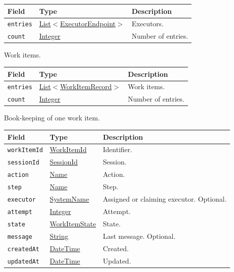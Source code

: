 \documentclass[a4paper]{arrowhead}
\newcommand{\mref}[1]{{\textcolor{ArrowheadPurple}{\hyperref[sec:model:#1]{#1}}}}
\newcommand{\pref}[1]{{\textcolor{ArrowheadGrey}{\hyperref[sec:model:primitives:#1]{#1}}}}
\begin{document}
{\small
\begin{longtable}{|p{3.9cm}|p{4.4cm}|p{7.5cm}|}

\hline
\rowcolor{gray!33} Field & Type & Description \\ \hline
\endhead
\texttt{entries} & \pref{List}$<$\mref{ExecutorEndpoint}$>$ & Executors. \\ \hline
\texttt{count} & \pref{Integer} & Number of entries. \\ \hline
\end{longtable}
}

Work items.

{\small
\begin{longtable}{|p{3.9cm}|p{4.4cm}|p{7.5cm}|}

\hline
\rowcolor{gray!33} Field & Type & Description \\ \hline
\endhead
\texttt{entries} & \pref{List}$<$\mref{WorkItemRecord}$>$ & Work items. \\ \hline
\texttt{count} & \pref{Integer} & Number of entries. \\ \hline
\end{longtable}
}

Book-keeping of one work item.

{\small
\begin{longtable}{|p{3.9cm}|p{4.4cm}|p{7.5cm}|}

\hline
\rowcolor{gray!33} Field & Type & Description \\ \hline
\endhead
\texttt{workItemId} & \pref{WorkItemId} & Identifier. \\ \hline
\texttt{sessionId} & \pref{SessionId} & Session. \\ \hline
\texttt{action} & \pref{Name} & Action. \\ \hline
\texttt{step} & \pref{Name} & Step. \\ \hline
\texttt{executor} & \pref{SystemName} & Assigned or claiming executor. Optional. \\ \hline
\texttt{attempt} & \pref{Integer} & Attempt. \\ \hline
\texttt{state} & \mref{WorkItemState} & State. \\ \hline
\texttt{message} & \pref{String} & Last message. Optional. \\ \hline
\texttt{createdAt} & \pref{DateTime} & Created. \\ \hline
\texttt{updatedAt} & \pref{DateTime} & Updated. \\ \hline
\end{longtable}
}
\end{document}
